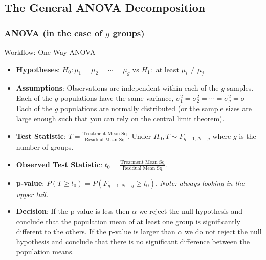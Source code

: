 \documentclass[a4paper]{article}\usepackage[]{graphicx}\usepackage[]{xcolor}
\begin{document}
\subsection{The General ANOVA Decomposition}
\subsubsection{ANOVA (in the case of \( g \) groups)}
\begin{redbox}{Workflow: One-Way ANOVA}
	\begin{itemize}
		\item \textbf{Hypotheses}: \( H_0: \mu_1 = \mu_2 = \dotsb = \mu_g \) vs \( H_1: \) at least \( \mu_i \neq \mu_j \)
		\item \textbf{Assumptions}: Observations are independent within each of the \( g \) samples. Each of the \( g \) populations have the same variance, \( \sigma^2_1 = \sigma_2^2 = \dotsb = \sigma_g^2 = \sigma \) Each of the \( g \) populations are normally distributed (or the sample sizes are large enough such that you can rely on the central limit theorem).
		\item \textbf{Test Statistic}: \( T = \frac{\text{Treatment Mean Sq}}{\text{Residual Mean Sq}} \). Under \( H_0, T \sim F_{g-1,N-g} \) where \( g \) is the number of groups.
		\item \textbf{Observed Test Statistic}: \( t_0 = \frac{\text{Treatment Mean Sq}}{\text{Residual Mean Sq}} \).
		\item \textbf{p-value}: \( P (T \geq t_0) = P(F_{g-1,N-g} \geq t_0) \). \textit{Note: always looking in the upper tail.}
		\item \textbf{Decision}: If the p-value is less then \( \alpha \) we reject the null hypothesis and conclude that the population mean of at least one group is significantly different to the others. If the p-value is larger than \( \alpha \) we do not reject the null hypothesis and conclude that there is no significant difference between the population means.
	\end{itemize}
\end{redbox}
\end{document}

